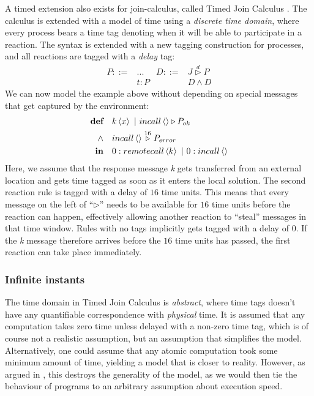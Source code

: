 A timed extension also exists for join-calculus, called Timed Join
Calculus \cite{timed-join}. The calculus is extended with a model of
time using a \emph{discrete time domain}, where every process bears a
time tag denoting when it will be able to participate in a reaction.
The syntax is extended with a new tagging construction for processes,
and all reactions are tagged with a
\emph{delay} tag:
\begin{align*}
  P ::={} & ...    & D ::={}& J \stackrel{d}{\triangleright} P \\
          & t : P  &        & D \land D
\end{align*}
We can now model the example above without depending on special
messages that get captured by the environment:
\begin{align*}
  \textbf{def}\quad & \atm k<x> ~|~ \atm incall<> \triangleright P_{ok} \\
  \land\quad & \atm incall<> \stackrel{16}{\triangleright} P_{error} \\
  \textbf{in}\quad & \atm 0:remotecall<k> ~|~ \atm 0:incall<>
\end{align*}
Here, we assume that the response message \emph{k} gets transferred
from an external location and gets time tagged as soon as it enters
the local solution.  The second reaction rule is tagged with a delay
of $16$ time units.  This means that every message on the left of
``$\triangleright$'' needs to be available for $16$ time units before
the reaction can happen, effectively allowing another reaction to
``steal'' messages in that time window. Rules with no tags implicitly
gets tagged with a delay of $0$. If the \emph{k} message therefore
arrives before the $16$ time units has passed, the first reaction can
take place immediately.


\subsubsection{Infinite instants}

The time domain in Timed Join Calculus is \emph{abstract}, where time
tags doesn't have any quantifiable correspondence with \emph{physical}
time. It is assumed that any computation takes zero time unless
delayed with a non-zero time tag, which is of course not a realistic
assumption, but an assumption that simplifies the model.
Alternatively, one could assume that any atomic computation took some
minimum amount of time, yielding a model that is closer to reality.
However, as argued in \cite{nicollin-overview}, this destroys the
generality of the model, as we would then tie the behaviour of programs
to an arbitrary assumption about execution speed.

